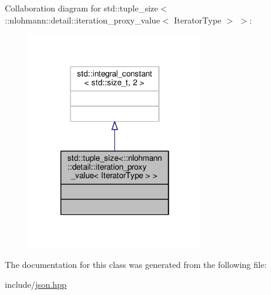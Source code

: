 Collaboration diagram for std\+:\+:tuple\+\_\+size$<$\+:\+:nlohmann\+:\+:detail\+:\+:iteration\+\_\+proxy\+\_\+value$<$ Iterator\+Type $>$ $>$\+:
\nopagebreak
\begin{figure}[H]
\begin{center}
\leavevmode
\includegraphics[width=214pt]{classstd_1_1tuple__size_3_1_1nlohmann_1_1detail_1_1iteration__proxy__value_3_01IteratorType_01_4_01_4__coll__graph}
\end{center}
\end{figure}


The documentation for this class was generated from the following file\+:\begin{DoxyCompactItemize}
\item 
include/\hyperlink{json_8hpp}{json.\+hpp}\end{DoxyCompactItemize}
